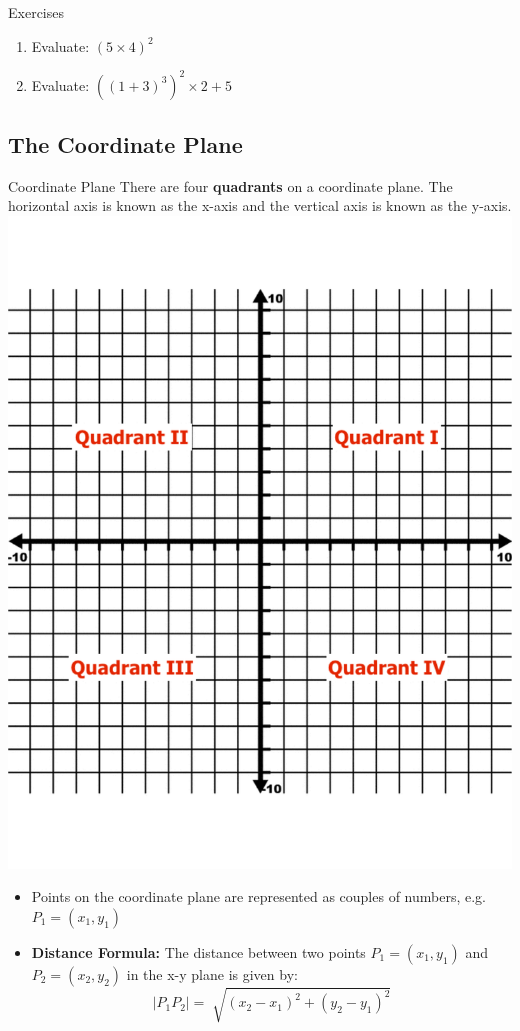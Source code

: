 \documentclass[]{beamer}
\begin{document}
    \begin{frame}{Exercises}
        \begin{enumerate}
            \item Evaluate: $(5\times 4)^2$
            \item Evaluate: $((1+3)^3)^2 \times 2 + 5$
        \end{enumerate}
    \end{frame}

    \subsection{The Coordinate Plane}
    
    \begin{frame}{Coordinate Plane}
        There are four \textbf{quadrants} on a coordinate plane. The horizontal axis is known as the x-axis and the vertical axis is known as the y-axis. \\
            \includegraphics[scale=0.15, trim=-450 100 0 50]{img/coordplan_quadlab.pdf}
        \begin{itemize}
            \item<2-> Points on the coordinate plane are represented as couples of numbers, e.g. $P_1 = (x_1, y_1)$
            \item<3->             
\textbf{Distance Formula:} The distance between two points $P_1 = (x_1, y_1)$ and $P_2 = (x_2, y_2) $ in the x-y plane is given by:
\begin{equation*}
|P_1P_2| = \sqrt[]{(x_2-x_1)^2+(y_2-y_1)^2}
\end{equation*}
        \end{itemize}
    \end{frame}
\end{document}
